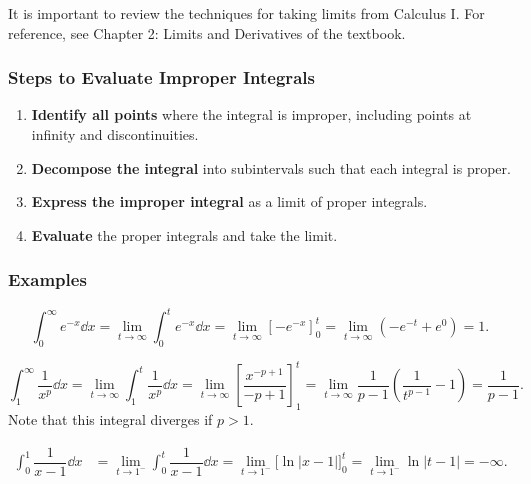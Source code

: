 \begin{tcolorbox}
    It is important to review the techniques for taking limits from Calculus I. For reference, see Chapter 2: Limits and Derivatives of the textbook.
\end{tcolorbox}



\subsubsection{Steps to Evaluate Improper Integrals}
\begin{enumerate}
    \item \textbf{Identify all points} where the integral is improper, including points at infinity and discontinuities.
    \item \textbf{Decompose the integral} into subintervals such that each integral is proper.
    \item \textbf{Express the improper integral} as a limit of proper integrals.
    \item \textbf{Evaluate} the proper integrals and take the limit.
\end{enumerate}


\subsubsection{Examples}
\begin{ex}
    \[\int_0^\infty e^{-x} \dd x = \lim_{t \to \infty} \int_0^t e^{-x} \dd x = \lim_{t \to \infty} \left[-e^{-x}\right]_0^t = \lim_{t \to \infty} \left(-e^{-t} + e^0\right) = 1.\]
\end{ex}

\begin{ex}
    \[\int_1^\infty \dfrac{1}{x^p} \dd x = \lim_{t \to \infty} \int_1^t \dfrac{1}{x^p} \dd x = \lim_{t \to \infty} \left[\dfrac{x^{-p+1}}{-p+1}\right]_1^t = \lim_{t \to \infty} \dfrac{1}{p-1}\left(\dfrac{1}{t^{p-1}} - 1\right) = \dfrac{1}{p-1}.\]
Note that this integral diverges if $p > 1$. 
\end{ex}

\begin{ex}
    \begin{align*}
    \int_0^1 \dfrac{1}{x-1} \dd x &= \lim_{t \to 1^-} \int_0^t \dfrac{1}{x-1} \dd x = \lim_{t \to 1^-} \big[\ln|x-1|\big]_0^t = \lim_{t \to 1^-} \ln|t-1| = -\infty.
\end{align*}
\end{ex}

